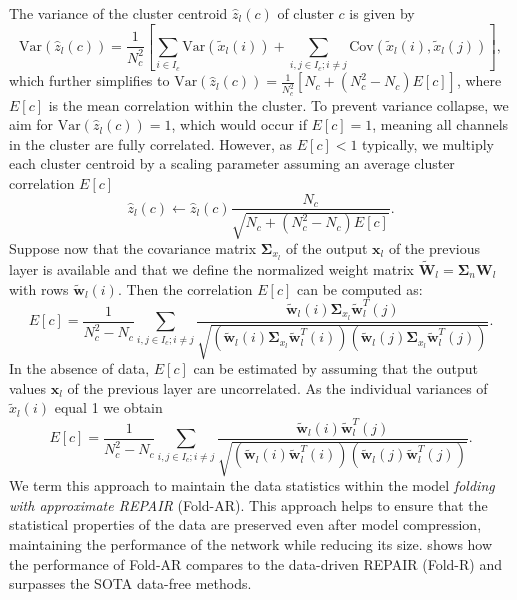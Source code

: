 \documentclass{article}
\begin{document}
{The variance of the cluster centroid $\hat{z}_l(c)$ of cluster $c$ is given by
\[
\text{Var}(\hat{z}_l(c)) = \frac{1}{N_c^2} \left[ \sum_{i \in I_c} \text{Var}(\tilde{x}_l(i)) + \sum_{i, j \in I_c ; i \not= j} \text{Cov}(\tilde{x}_l(i), \tilde{x}_l(j)) \right],
\]
which further simplifies to
$\text{Var}(\hat{z}_l(c)) = \frac{1}{N_c^2} \left[ N_c + (N_c^2 - N_c) E[c] \right]$,
where $E[c]$ is the mean correlation within the cluster. 
% 
To prevent variance collapse, we aim for $\text{Var}(\hat{z}_l(c)) = 1$, which would occur if $E[c] = 1$, meaning all channels in the cluster are fully correlated. However, as $E[c] < 1$ typically, we multiply each cluster centroid by a scaling parameter assuming an average cluster correlation $E[c]$
\[
\hat{z}_l(c) \leftarrow \hat{z}_l(c) \frac{N_c}{\sqrt{N_c + (N_c^2 - N_c) E[c]}}.
\]
Suppose now that the covariance matrix $\mathbf{\Sigma}_{x_l}$ of the output $\mathbf{x}_l$ of the previous layer is available and that we define the normalized weight matrix $\mathbf{\tilde{W}}_l = \mathbf{\Sigma}_n \mathbf{W}_l$ with rows $\mathbf{\tilde{w}}_l(i)$. Then the correlation $E[c]$ can be computed as:
\[
E[c] = \frac{1}{N_c^2 - N_c}\sum_{i, j \in I_c ; i \neq j} \frac{\mathbf{\tilde{w}}_l(i) \mathbf{\Sigma}_{x_l} \mathbf{\tilde{w}}_l^T(j)}{\sqrt{(\mathbf{\tilde{w}}_l(i) \mathbf{\Sigma}_{x_l} \mathbf{\tilde{w}}_l^T(i))(\mathbf{\tilde{w}}_l(j) \mathbf{\Sigma}_{x_l} \mathbf{\tilde{w}}_l^T(j))}}.
\]
In the absence of data, $E[c]$ can be estimated by assuming that the output values $\mathbf{x}_l$ of the previous layer are uncorrelated. As the individual variances of $\tilde{x}_l(i)$ equal 1 we obtain 
\[
E[c] = \frac{1}{N_c^2 - N_c}\sum_{i, j \in I_c ; i \neq j} \frac{\mathbf{\tilde{w}}_l(i) \mathbf{\tilde{w}}_l^T(j)}{\sqrt{(\mathbf{\tilde{w}}_l(i) \mathbf{\tilde{w}}_l^T(i))(\mathbf{\tilde{w}}_l(j) \mathbf{\tilde{w}}_l^T(j))}}.
\]
We term this approach to maintain the data statistics within the model \emph{folding with approximate REPAIR} (Fold-AR). This approach helps to ensure that the statistical properties of the data are preserved even after model compression, maintaining the performance of the network while reducing its size.  shows how the performance of Fold-AR compares to the data-driven REPAIR (Fold-R) and surpasses the SOTA data-free methods.


}
\end{document}
